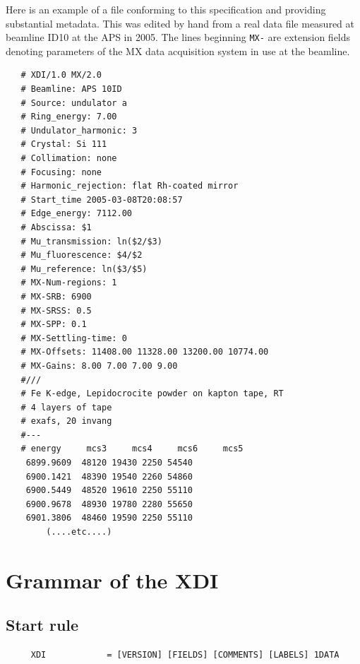 \documentclass{article}
\newenvironment{Boxedminipage}%
    {\begin{Sbox}\begin{minipage}}%
    {\end{minipage}\end{Sbox}\shadowbox{\TheSbox}}
\begin{document}
Here is an example of a file conforming to this specification and
providing substantial metadata.  This was edited by hand from a real
data file measured at beamline ID10 at the APS in 2005.  The lines
beginning \texttt{MX-} are extension fields denoting parameters of the
MX data acquisition system in use at the beamline.

\begin{center}
\begin{Boxedminipage}[h]{0.7\linewidth}
\begin{verbatim}
   # XDI/1.0 MX/2.0
   # Beamline: APS 10ID
   # Source: undulator a
   # Ring_energy: 7.00
   # Undulator_harmonic: 3
   # Crystal: Si 111
   # Collimation: none
   # Focusing: none
   # Harmonic_rejection: flat Rh-coated mirror
   # Start_time 2005-03-08T20:08:57
   # Edge_energy: 7112.00
   # Abscissa: $1
   # Mu_transmission: ln($2/$3)
   # Mu_fluorescence: $4/$2
   # Mu_reference: ln($3/$5)
   # MX-Num-regions: 1
   # MX-SRB: 6900
   # MX-SRSS: 0.5
   # MX-SPP: 0.1
   # MX-Settling-time: 0
   # MX-Offsets: 11408.00 11328.00 13200.00 10774.00
   # MX-Gains: 8.00 7.00 7.00 9.00
   #///
   # Fe K-edge, Lepidocrocite powder on kapton tape, RT
   # 4 layers of tape
   # exafs, 20 invang
   #---
   # energy     mcs3     mcs4     mcs6     mcs5
    6899.9609  48120 19430 2250 54540
    6900.1421  48390 19540 2260 54860
    6900.5449  48520 19610 2250 55110
    6900.9678  48930 19780 2280 55650
    6901.3806  48460 19590 2250 55110
        (....etc....)
\end{verbatim}
\end{Boxedminipage}
\end{center}


\newpage

\section{Grammar of the XDI}
\label{apdx:gram}

\subsection{Start rule}
\label{sec:startrule}

\begin{verbatim}
     XDI            = [VERSION] [FIELDS] [COMMENTS] [LABELS] 1DATA
\end{verbatim}
\end{document}
